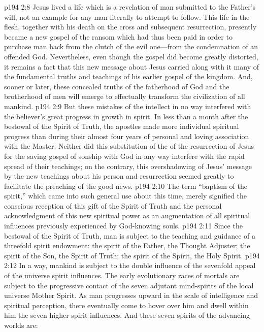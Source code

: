 \pc \vs p194 2:8 Jesus lived a life which is a revelation of man submitted to the Father’s will, not an example for any man literally to attempt to follow. This life in the flesh, together with his death on the cross and subsequent resurrection, presently became a new gospel of the ransom which had thus been paid in order to purchase man back from the clutch of the evil one---from the condemnation of an offended God. Nevertheless, even though the gospel did become greatly distorted, it remains a fact that this new message about Jesus carried along with it many of the fundamental truths and teachings of his earlier gospel of the kingdom. And, sooner or later, these concealed truths of the fatherhood of God and the brotherhood of men will emerge to effectually transform the civilization of all mankind.\plusone
\vs p194 2:9 But these mistakes of the intellect in no way interfered with the believer’s great progress in growth in spirit. In less than a month after the bestowal of the Spirit of Truth, the apostles made more individual spiritual progress than during their almost four years of personal and loving association with the Master. Neither did this substitution of the  of the resurrection of Jesus for the saving gospel  of sonship with God in any way interfere with the rapid spread of their teachings; on the contrary, this overshadowing of Jesus’ message by the new teachings about his person and resurrection seemed greatly to facilitate the preaching of the good news.
\pc \vs p194 2:10 The term “baptism of the spirit,” which came into such general use about this time, merely signified the conscious reception of this gift of the Spirit of Truth and the personal acknowledgment of this new spiritual power as an augmentation of all spiritual influences previously experienced by God\hyp{}knowing souls.
\pc \vs p194 2:11 Since the bestowal of the Spirit of Truth, man is subject to the teaching and guidance of a threefold spirit endowment: the spirit of the Father, the Thought Adjuster; the spirit of the Son, the Spirit of Truth; the spirit of the Spirit, the Holy Spirit.
\vs p194 2:12 In a way, mankind is subject to the double influence of the sevenfold appeal of the universe spirit influences. The early evolutionary races of mortals are subject to the progressive contact of the seven adjutant mind\hyp{}spirits of the local universe Mother Spirit. As man progresses upward in the scale of intelligence and spiritual perception, there eventually come to hover over him and dwell within him the seven higher spirit influences. And these seven spirits of the advancing worlds are:
